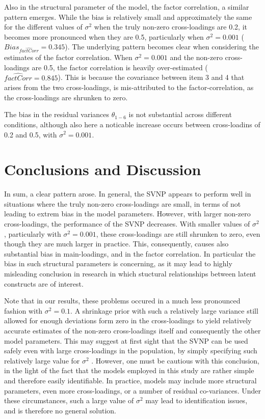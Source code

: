 \documentclass[
  english,
  man]{apa6}
\begin{document}
Also in the structural parameter of the model, the factor correlation, a similar pattern emerges. While the bias is relatively small and approximately the same for the different values of \(\sigma^2\) when the truly non-zero cross-loadings are 0.2, it becomes more pronounced when they are 0.5, particularly when \(\sigma^2 = 0.001\) (\(Bias_{\hat{factCorr}} = 0.345\)). The underlying pattern becomes clear when considering the estimates of the factor correlation. When \(\sigma^2 = 0.001\) and the non-zero cross-loadings are 0.5, the factor correlation is heavily over-estimated (\(\hat{factCorr} = 0.845\)). This is because the covariance between item 3 and 4 that arises from the two cross-loadings, is mis-attributed to the factor-correlation, as the cross-loadings are shrunken to zero.

The bias in the residual variances \(\theta_{1-6}\) is not substantial across different conditions, although also here a noticable increase occurs between cross-loadins of 0.2 and 0.5, with \(\sigma^2 = 0.001\).

\hypertarget{conclusions-and-discussion}{%
\section{Conclusions and Discussion}\label{conclusions-and-discussion}}

In sum, a clear pattern arose. In general, the SVNP appears to perform well in situations where the truly non-zero cross-loadings are small, in terms of not leading to extrem bias in the model parameters. However, with larger non-zero cross-loadings, the performance of the SVNP decreases. With smaller values of \(\sigma^2\), particularly with \(\sigma^2 = 0.001\), these cross-loadings are still shrunken to zero, even though they are much larger in practice. This, consequently, causes also substantial bias in main-loadings, and in the factor correlation. In particular the bias in such structural parameters is concerning, as it may lead to highly misleading conclusion in research in which stuctural relationships between latent constructs are of interest.

Note that in our results, these problems occured in a much less pronounced fashion with \(\sigma^2 = 0.1\). A shrinkage prior with such a relatively large variance still allowed for enough deviations form zero in the cross-loadings to yield relatively accurate estimates of the non-zero cross-loadings itself and consequently the other model parameters. This may suggest at first sight that the SVNP can be used safely even with large cross-loadings in the population, by simply specifying such relatively large value for \(\sigma^2\) . However, one must be cautious with this conclusion, in the light of the fact that the models employed in this study are rather simple and therefore easily identifiable. In practice, models may include more structural parameters, even more cross-loadings, or a number of residual co-variances. Under these circumstances, such a large value of \(\sigma^2\) may lead to identification issues, and is therefore no general solution.
\end{document}

